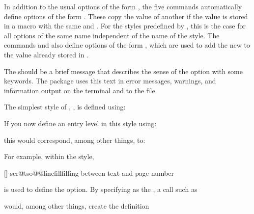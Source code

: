 In addition to the usual options of the
form , the five
 commands automatically define options of
the form . These copy the value of
another  if the value is stored in a macro with the same
 and . For the styles predefined by
, this is the case for all options of the same name
independent of the name of the style. The commands
 and  also
define options of the form , which are used
to add the new  to the value already stored in
.

The  should be a brief message that describes the sense
of the option with some keywords. The  package uses this text
in error messages, warnings, and information output on the terminal and to the
 file.

The simplest style of , , is defined
using:
\begin{lstcode}
\end{lstcode}
If you now define an entry level  in this style using:
\begin{lstcode}
\end{lstcode}
this would correspond, among other things, to:
\begin{lstcode}
  \def\dummytocdepth{1}
  \def\l@dummy#1#2{}
\end{lstcode}

For example, within the  style,
\begin{lstcode}
  [\TOCLineLeaderFill]%
  {scr@tso@}{@linefill}{filling between text and page number}%
\end{lstcode}
is used to define the  option. By specifying 
 as the ,
a call such as
\begin{lstcode}
\end{lstcode}
would, among other things, create the definition
\begin{lstcode}
  \def\scr@tso@part@linefill{\TOCLineLeaderFill}
\end{lstcode}

